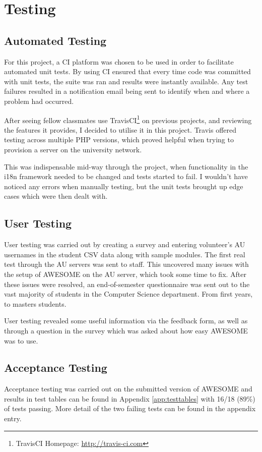 \chapter{Testing}
	
	\section{Automated Testing}
	
	For this project, a \ac{CI} platform was chosen to be used in order to facilitate automated unit tests.
	By using \ac{CI} ensured that every time code was committed with unit tests, the suite was ran and results were instantly available.
	Any test failures resulted in a notification email being sent to identify when and where a problem had occurred.
	
	After seeing fellow classmates use TravisCI\footnote{TravisCI Homepage: \url{http://travis-ci.com}} on previous projects, and reviewing the features it provides, I decided to utilise it in this project.
	Travis offered testing across multiple PHP versions, which proved helpful when trying to provision a server on the university network.
	
	This was indispensable mid-way through the project, when functionality in the \ac{i18n} framework needed to be changed and tests started to fail.
	I wouldn't have noticed any errors when manually testing, but the unit tests brought up edge cases which were then dealt with.
	
	\section{User Testing}
	
	User testing was carried out by creating a survey and entering volunteer's \ac{AU} usernames in the student \ac{CSV} data along with sample modules.
	The first real test through the \ac{AU} servers was sent to staff.
	This uncovered many issues with the setup of \ac{AWESOME} on the \ac{AU} server, which took some time to fix.
	After these issues were resolved, an end-of-semester questionnaire was sent out to the vast majority of students in the Computer Science department. From first years, to masters students.
	
	User testing revealed some useful information via the feedback form, as well as through a question in the survey which was asked about how easy \ac{AWESOME} was to use.
	
	\section{Acceptance Testing}
	
	Acceptance testing was carried out on the submitted version of \ac{AWESOME} and results in test tables can be found in Appendix \autoref{app:testtables} with 16/18 (89\%) of tests passing.
	More detail of the two failing tests can be found in the appendix entry.

